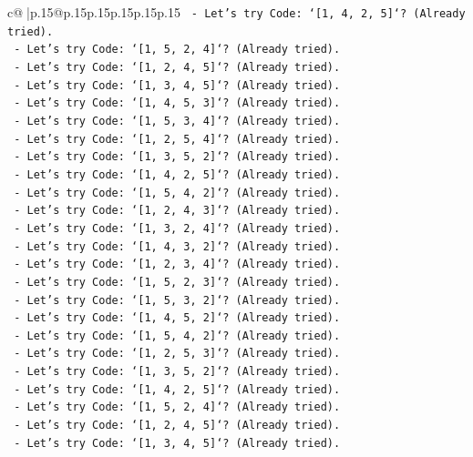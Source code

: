 \documentclass{article}
\begin{document}
{\begin{supertabular}{c@{$\;$}|p{.15\linewidth}@{}p{.15\linewidth}p{.15\linewidth}p{.15\linewidth}p{.15\linewidth}p{.15\linewidth}}
{{{\texttt{    {-} Let's try Code: `{[}1, 4, 2, 5{]}`? (Already tried).} \\
\texttt{    {-} Let's try Code: `{[}1, 5, 2, 4{]}`? (Already tried).} \\
\texttt{    {-} Let's try Code: `{[}1, 2, 4, 5{]}`? (Already tried).} \\
\texttt{    {-} Let's try Code: `{[}1, 3, 4, 5{]}`? (Already tried).} \\
\texttt{    {-} Let's try Code: `{[}1, 4, 5, 3{]}`? (Already tried).} \\
\texttt{    {-} Let's try Code: `{[}1, 5, 3, 4{]}`? (Already tried).} \\
\texttt{    {-} Let's try Code: `{[}1, 2, 5, 4{]}`? (Already tried).} \\
\texttt{    {-} Let's try Code: `{[}1, 3, 5, 2{]}`? (Already tried).} \\
\texttt{    {-} Let's try Code: `{[}1, 4, 2, 5{]}`? (Already tried).} \\
\texttt{    {-} Let's try Code: `{[}1, 5, 4, 2{]}`? (Already tried).} \\
\texttt{    {-} Let's try Code: `{[}1, 2, 4, 3{]}`? (Already tried).} \\
\texttt{    {-} Let's try Code: `{[}1, 3, 2, 4{]}`? (Already tried).} \\
\texttt{    {-} Let's try Code: `{[}1, 4, 3, 2{]}`? (Already tried).} \\
\texttt{    {-} Let's try Code: `{[}1, 2, 3, 4{]}`? (Already tried).} \\
\texttt{    {-} Let's try Code: `{[}1, 5, 2, 3{]}`? (Already tried).} \\
\texttt{    {-} Let's try Code: `{[}1, 5, 3, 2{]}`? (Already tried).} \\
\texttt{    {-} Let's try Code: `{[}1, 4, 5, 2{]}`? (Already tried).} \\
\texttt{    {-} Let's try Code: `{[}1, 5, 4, 2{]}`? (Already tried).} \\
\texttt{    {-} Let's try Code: `{[}1, 2, 5, 3{]}`? (Already tried).} \\
\texttt{    {-} Let's try Code: `{[}1, 3, 5, 2{]}`? (Already tried).} \\
\texttt{    {-} Let's try Code: `{[}1, 4, 2, 5{]}`? (Already tried).} \\
\texttt{    {-} Let's try Code: `{[}1, 5, 2, 4{]}`? (Already tried).} \\
\texttt{    {-} Let's try Code: `{[}1, 2, 4, 5{]}`? (Already tried).} \\
\texttt{    {-} Let's try Code: `{[}1, 3, 4, 5{]}`? (Already tried).} \\
}}}
\end{supertabular}}
\end{document}
